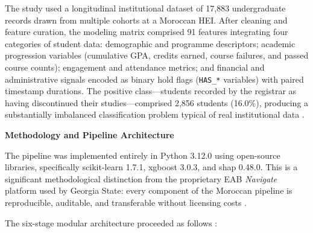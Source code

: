 \documentclass[12pt]{report}
\begin{document}
The study used a longitudinal institutional dataset of 17,883 undergraduate
records drawn from multiple cohorts at a Moroccan HEI. After cleaning and
feature curation, the modeling matrix comprised 91 features integrating
four categories of student data: demographic and programme descriptors;
academic progression variables (cumulative GPA, credits earned, course
failures, and passed course counts); engagement and attendance metrics;
and financial and administrative signals encoded as binary hold flags
(\texttt{HAS\_*} variables) with paired timestamp durations. The positive
class---students recorded by the registrar as having discontinued their
studies---comprised 2,856 students (16.0\%), producing a substantially
imbalanced classification problem typical of real institutional data
\parencite{bettahi2025}.

\textbf{Methodology and Pipeline Architecture}

The pipeline was implemented entirely in Python 3.12.0 using
open-source libraries, specifically scikit-learn 1.7.1,
xgboost 3.0.3, and shap 0.48.0. This is a significant
methodological distinction from the proprietary EAB \textit{Navigate}
platform used by Georgia State: every component of the Moroccan pipeline
is reproducible, auditable, and transferable without licensing costs
\parencite{bettahi2025}.

The six-stage modular architecture proceeded as follows
\parencite{bettahi2025}:
\end{document}
